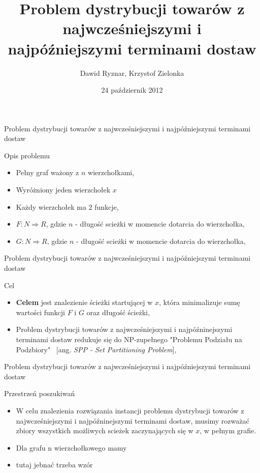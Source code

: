 \documentclass{beamer}
\title{Problem  dystrybucji towarów z najwcześniejszymi i najpóźniejszymi terminami dostaw}
\author{Dawid Ryznar, Krzystof Zielonka}
\date{24 październik 2012}
\begin{document}
\frame{\titlepage}

\begin{frame}{Problem  dystrybucji towarów z najwcześniejszymi i najpóźniejszymi terminami dostaw}

\begin{block}{Opis problemu}
\begin{itemize}
\item Pełny graf ważony z $n$ wierzchołkami,
\pause
\item Wyróżniony jeden wierzchołek $x$
\pause
\item Każdy wierzchołek ma $2$ funkcje,
\pause
\item $F:N \Rightarrow R$, gdzie $n$ - długość scieżki w momencie dotarcia do wierzchołka,
\pause
\item  $G:N \Rightarrow R$, gdzie $n$ - długość scieżki w momencie dotarcia do wierzchołka,
\end{itemize}
\end{block}
\end{frame}

\begin{frame}{Problem  dystrybucji towarów z najwcześniejszymi i najpóźniejszymi terminami dostaw}
\begin{block}{Cel}
\begin{itemize}
\item \textbf{Celem} jest znalezienie ścieżki startującej w $x$, która minimalizuje sumę wartości funkcji $F$ i $G$ oraz długość ścieżki,
\pause
\item Problem dystrybucji towarów z najwcześniejszymi i najpóźninejszymi terminami dostaw redukuje się do NP-zupełnego "Problemu Podziału na Podzbiory" \ [ang. \textit{SPP - Set Partitioning Problem}],
\end{itemize}
\end{block}
\end{frame}

\begin{frame}{Problem  dystrybucji towarów z najwcześniejszymi i najpóźniejszymi terminami dostaw}
\begin{block}{Przestrzeń poszukiwań}
\begin{itemize}
\item W celu znalezienia rozwiązania instancji problemu dystrybucji towarów z najwcześniejszymi i najpóźninejszymi terminami dostaw, musimy rozważać zbiory wszystkich możliwych scieżek zaczynających się w $x$, w pełnym grafie.
\pause
\item Dla grafu n wierzchołkowego mamy 
\pause
\item  tutaj jebnać trzeba wzór
\end{itemize}
\end{block}
\end{frame}
\end{document}
